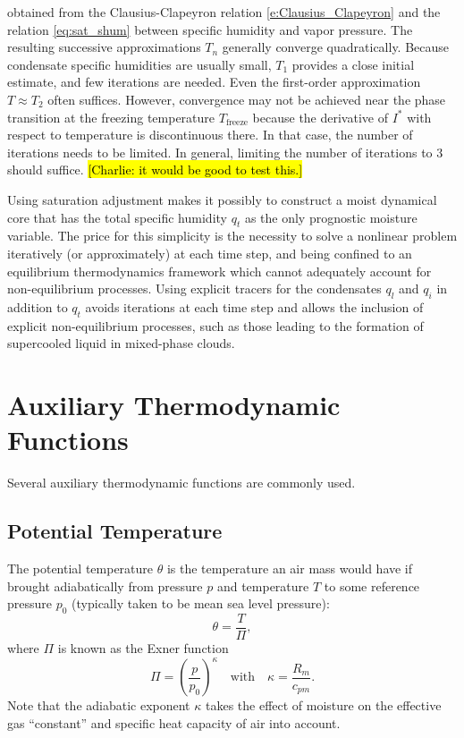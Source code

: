 \documentclass{report}
\begin{document}
obtained from the Clausius-Clapeyron relation \eqref{e:Clausius_Clapeyron} and the relation \eqref{eq:sat_shum} between specific humidity and vapor pressure. The resulting successive approximations $T_n$ generally converge quadratically. Because condensate specific humidities are usually small, $T_1$ provides a close initial estimate, and few iterations are needed. Even the first-order approximation $T\approx T_2$ often suffices. However, convergence may not be achieved near the phase transition at the freezing temperature $T_{\mathrm{freeze}}$ because the derivative of $I^*$ with respect to temperature is discontinuous there. In that case, the number of iterations needs to be limited. In general, limiting the number of iterations to 3 should suffice. \hl{[Charlie: it would be good to test this.]}

Using saturation adjustment makes it possibly to construct a moist dynamical core that has the total specific humidity $q_t$ as the only prognostic moisture variable. The price for this simplicity is the necessity to solve a nonlinear problem iteratively (or approximately) at each time step, and being confined to an equilibrium thermodynamics framework which cannot adequately account for non-equilibrium processes. Using explicit tracers for the condensates $q_l$ and $q_i$ in addition to $q_t$ avoids iterations at each time step and allows the inclusion of explicit non-equilibrium processes, such as those leading to the formation of supercooled liquid in mixed-phase clouds. 

\section{Auxiliary Thermodynamic Functions}

Several auxiliary thermodynamic functions are commonly used. 

\subsection{Potential Temperature} The potential temperature $\theta$ is the temperature an air mass would have if brought adiabatically from pressure $p$ and temperature $T$ to some reference pressure $p_0$ (typically taken to be mean sea level pressure):
\begin{equation}\label{e:pot_temp_press_T}
\theta = \frac{T}{\Pi},  
\end{equation}
where $\Pi$ is known as the Exner function
\begin{equation}
    \Pi  = \left( \frac{p}{p_0} \right)^\kappa \quad \text{with} \quad \kappa = \frac{R_m}{c_{pm}}.
\end{equation}
Note that the adiabatic exponent $\kappa$ takes the effect of  moisture on the effective gas ``constant'' and specific heat capacity of air into account.
\end{document}
